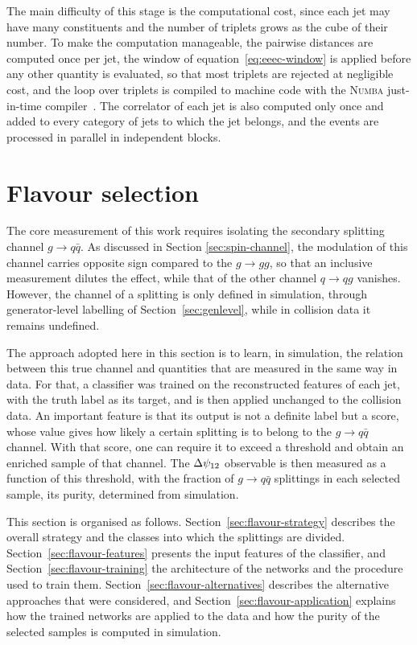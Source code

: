 The main difficulty of this stage is the computational cost, since each jet may
have many constituents and the number of triplets grows as the cube of their
number. To make the computation manageable, the pairwise distances are computed
once per jet, the window of equation~\eqref{eq:eeec-window} is applied before any other
quantity is evaluated, so that most triplets are rejected at negligible cost, and
the loop over triplets is compiled to machine code with the \textsc{Numba}
just-in-time compiler~\cite{Lam:2015numba}. The correlator of each jet is also
computed only once and added to every category of jets to which the jet belongs,
and the events are processed in parallel in independent blocks.

\section{Flavour selection}
\label{sec:flavour}

The core measurement of this work requires isolating the secondary splitting channel $g \to q\bar{q}$.
As discussed in Section \ref{sec:spin-channel}, the modulation of this channel carries 
opposite sign compared to the $g \to gg$, so that an inclusive measurement dilutes the effect,
while that of the other channel $q \to qg$ vanishes. However, the channel of a splitting is only
defined in simulation, through generator-level labelling of Section~\ref{sec:genlevel}, while
in collision data it remains undefined.

The approach adopted here in this section is to learn, in simulation, the relation between
this true channel and quantities that are measured in the same way in data. For that,
a classifier was trained on the reconstructed features of each jet, with the truth
label as its target, and is then applied unchanged to the collision data. An important
feature is that its output is not a definite label but a score, whose value gives how likely
a certain splitting is to belong to the $g \to q\bar{q}$ channel. With that score, one 
can require it to exceed a threshold and obtain an enriched sample of that channel.
The $\Delta\psi_{12}$ observable is then measured as a function of this threshold,
with the fraction of $g \to q\bar{q}$ splittings in each selected sample, its
purity, determined from simulation.

This section is organised as follows. Section~\ref{sec:flavour-strategy} describes
the overall strategy and the classes into which the splittings are divided.
Section~\ref{sec:flavour-features} presents the input features of the classifier,
and Section~\ref{sec:flavour-training} the architecture of the networks and the
procedure used to train them. Section~\ref{sec:flavour-alternatives} describes
the alternative approaches that were considered, and
Section~\ref{sec:flavour-application} explains how the trained networks are
applied to the data and how the purity of the selected samples is computed in
simulation.

